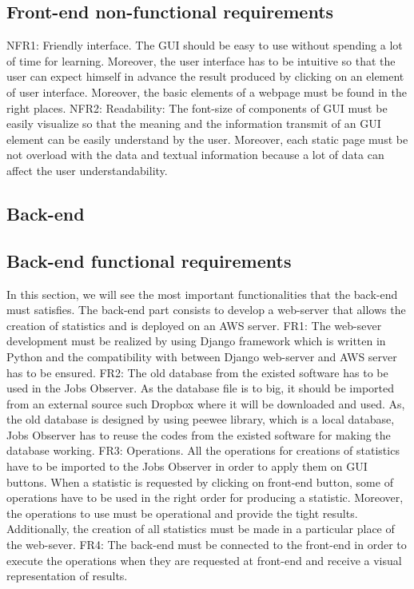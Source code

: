 \documentclass[conference,compsoc]{IEEEtran}
\begin{document}
\subsection{Front-end non-functional requirements}
NFR1: Friendly interface. The GUI should be easy to use without spending a lot of time for learning. Moreover, the user interface has to be intuitive so that the user can expect himself in advance the result produced by clicking on an element of user interface. Moreover, the basic elements of a webpage must be found in the right places. 
\newline\newline
NFR2: Readability: The font-size of components of GUI must be easily visualize so that the meaning and the information transmit of an GUI element can be easily understand by the user. Moreover, each static page must be not overload with the data and textual information because a lot of data can affect the user understandability. 
\subsection{Back-end}
\subsection{Back-end functional requirements}
In this section, we will see the most important functionalities that the back-end must satisfies. The back-end part consists to develop a web-server that allows the creation of statistics and is deployed on an AWS server. 
\newline\newline
FR1: The web-sever development must be realized by using Django framework which is written in Python and the compatibility with between Django web-server and AWS server has to be ensured. 
\newline\newline
FR2: The old database from the existed software has to be used in the Jobs Observer. As the database file is to big, it should be imported from an external source such Dropbox where it will be downloaded and used. As, the old database is designed by using peewee library, which is a local database, Jobs Observer has to reuse the codes from the existed software for making the database working. 
\newline\newline
FR3: Operations. All the operations for creations of statistics have to be imported to the Jobs Observer in order to apply them on GUI buttons. When a statistic is requested by clicking on front-end button, some of operations have to be used in the right order for producing a statistic. Moreover, the operations to use must be operational and provide the tight results. Additionally, the creation of all statistics must be made in a particular place of the web-sever. 
\newline\newline
FR4: The back-end must be connected to the front-end in order to execute the operations when they are requested at front-end and receive a visual representation of results. 
\end{document}

